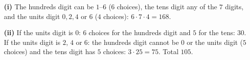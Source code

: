 \textbf{(i)} The hundreds digit can be $1$--$6$ ($6$ choices), the tens digit any of the $7$ digits, and the units digit $0,2,4$ or $6$ ($4$ choices): $6\cdot7\cdot4=\boxed{168}$.

\textbf{(ii)} If the units digit is $0$: $6$ choices for the hundreds digit and $5$ for the tens: $30$. If the units digit is $2$, $4$ or $6$: the hundreds digit cannot be $0$ or the units digit ($5$ choices) and the tens digit has $5$ choices: $3\cdot25=75$. Total $\boxed{105}$.
